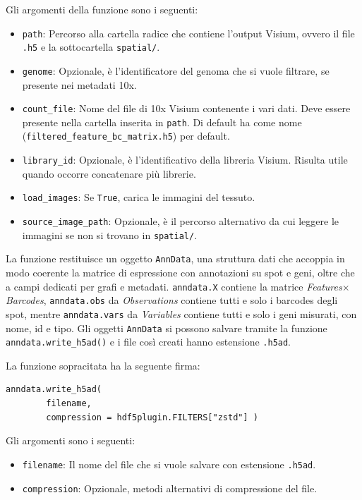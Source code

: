 \noindent
Gli argomenti della funzione sono i seguenti:
\begin{itemize}
  \item \texttt{path}: Percorso alla cartella radice che contiene l'output Visium, ovvero il file \texttt{.h5} e la sottocartella \texttt{spatial/}.
  \item \texttt{genome}: Opzionale, è l'identificatore del genoma che si vuole filtrare, se presente nei metadati 10x.
  \item \texttt{count\_file}: Nome del file di 10x Visium contenente i vari dati. Deve essere presente nella cartella inserita in \texttt{path}. Di default ha come nome (\texttt{filtered\_feature\_bc\_matrix.h5}) per default.
  \item \texttt{library\_id}: Opzionale, è l'identificativo della libreria Visium. Risulta utile quando occorre concatenare più librerie.
  \item \texttt{load\_images}: Se \texttt{True}, carica le immagini del tessuto.
  \item \texttt{source\_image\_path}: Opzionale, è il percorso alternativo da cui leggere le immagini se non si trovano in \texttt{spatial/}.
\end{itemize}

\noindent
La funzione restituisce un oggetto \texttt{AnnData}, una struttura dati che accoppia in modo coerente la matrice di espressione con annotazioni su spot 
e geni, oltre che a campi dedicati per grafi e metadati.
\texttt{anndata.X} contiene la matrice \textit{Features}$\times$\textit{Barcodes}, \texttt{anndata.obs} da \textit{Observations} contiene tutti e solo i barcodes degli spot, mentre 
\texttt{anndata.vars} da \textit{Variables} contiene tutti e solo i geni misurati, con nome, id e tipo.
Gli oggetti \texttt{AnnData} si possono salvare tramite la funzione \texttt{anndata.write\_h5ad()} e i file così creati hanno estensione \texttt{.h5ad}.

\medskip
\noindent
La funzione sopracitata ha la seguente firma:
\begin{center}
\begin{minipage}{8cm}
\begin{verbatim}
anndata.write_h5ad(
		filename,
		compression = hdf5plugin.FILTERS["zstd"] )
\end{verbatim}
\end{minipage}
\end{center}

\noindent
Gli argomenti sono i seguenti: 
\begin{itemize}
  \item \texttt{filename}: Il nome del file che si vuole salvare con estensione \texttt{.h5ad}.
  \item \texttt{compression}: Opzionale, metodi alternativi di compressione del file.
 \end{itemize}

